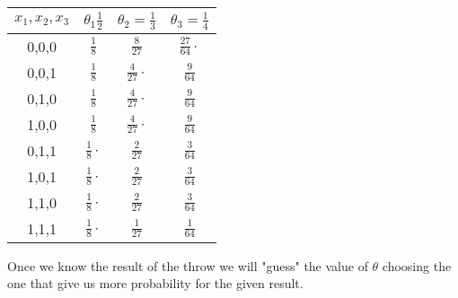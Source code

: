 \begin{enumerate}
\begin{eg}
	\begin{center}
		\begin{tabular}{ | c | c | c | c | }
			\hline
			$x_1,x_2,x_3$ & $\theta_1 \frac{1}{2}$ & $\theta_2=\frac{1}{3}$ & $\theta_3=\frac{1}{4}$ \\ \hline
			0,0,0 & $\frac{1}{8}$ & $\frac{8}{27}$ & $\frac{27}{64} \cdot$ \\ \hline
			0,0,1 & $\frac{1}{8}$ & $\frac{4}{27} \cdot$ & $\frac{9}{64}$ \\ \hline
			0,1,0 & $\frac{1}{8}$ & $\frac{4}{27} \cdot$ & $\frac{9}{64}$ \\ \hline
			1,0,0 & $\frac{1}{8}$ & $\frac{4}{27} \cdot$ & $\frac{9}{64}$ \\ \hline
			0,1,1 & $\frac{1}{8} \cdot$ & $\frac{2}{27}$ & $\frac{3}{64}$ \\ \hline
			1,0,1 & $\frac{1}{8} \cdot$ & $\frac{2}{27}$ & $\frac{3}{64}$ \\ \hline
			1,1,0 & $\frac{1}{8} \cdot$ & $\frac{2}{27}$ & $\frac{3}{64}$ \\ \hline
			1,1,1 & $\frac{1}{8} \cdot$ & $\frac{1}{27}$ & $\frac{1}{64}$ \\
			\hline
		\end{tabular}
	\end{center}
	Once we know the result of the throw we will "guess" the value of $\theta$ choosing the one that give us more probability for the given result.
	\end{eg}
\end{enumerate}
